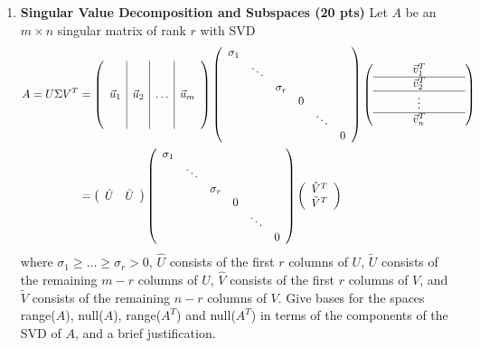 \begin{enumerate}
{}
\newpage
\item \textbf{Singular Value Decomposition and Subspaces  (20 pts)} 
Let $A$ be an $m \times n$ singular matrix of rank $r$ with SVD
\begin{align*}
A = U \Sigma V^T &= 
\left( \begin{array}{c|c|c|c} &&& \\ &&& \\ \vec{u}_1 & \vec{u}_2 & \ldots & \vec{u}_m \\ &&& \\ &&&  \end{array} \right)
\left( \begin{array}{cccccc} \sigma_1 &&&&& \\ & \ddots &&&& \\ && \sigma_r &&& \\ &&& 0 &&\\ &&&& \ddots &\\  &&&&& 0 \end{array} \right)
\left( \begin{array}{ccccccc} &&& \vec{v}_1^T &&& \\ \hline &&& \vec{v}_2^T &&& \\ \hline &&& \vdots &&& \\ \hline &&&
    \vec{v}_n^T &&&  \end{array} \right) \\
& = \left( \begin{array}{cc} \hat{U} & \tilde{U} \end{array} \right) 
\left( \begin{array}{cccccc} \sigma_1 &&&&& \\ & \ddots &&&& \\ && \sigma_r &&& \\ &&& 0 &&\\ &&&& \ddots &\\  &&&&& 0 \end{array} \right)
\left( \begin{array}{c} \hat{V}^T \\ \tilde{V}^T \end{array} \right) \\
\end{align*}
where $\sigma_1 \geq  \ldots \geq \sigma_r > 0$, $\hat{U}$ consists of the first $r$ columns of $U$, $\tilde{U}$ consists of the remaining $m-r$ columns of $U$,
$\hat{V}$ consists of the first $r$ columns of $V$, and $\tilde{V}$ consists of the remaining $n-r$ columns of $V$.
Give bases for the spaces range($A$), null($A$), range($A^T$) and null($A^T$) in terms of the components of the SVD of
$A$, and a brief justification.


\end{enumerate}
